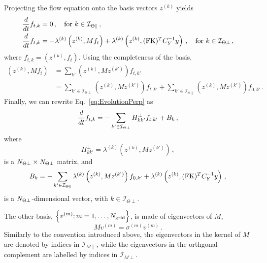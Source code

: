 \documentclass[11pt]{article}
\begin{document}
Projecting the flow equation onto the basis vectors $z^{(k)}$ yields
\begin{align}
  \label{eq:EvolutionPar}
  \frac{d}{dt} f_{t,k} &= 0\, , \quad \text{for}\ k \in \mathcal{I}_{\Theta\parallel}\, , \\
  \label{eq:EvolutionPerp}
  \frac{d}{dt} f_{t,k} &= - \lambda^{(k)} \left(z^{(k)}, M f_t\right) 
    + \lambda^{(k)} \left(z^{(k)}, (\mathrm{FK})^T C_Y^{-1} y\right)\, , \quad \text{for}\ k \in \mathcal{I}_{\Theta\perp}\, ,
\end{align}
where $f_{t,k} = \left(z^{(k)}, f_t\right)$. Using the completeness of the basis, 
\begin{align}
  \left(z^{(k)}, M f_t\right) 
    &= \sum_{k'} \left(z^{(k)}, M z^{(k')}\right) f_{t,k'} \\
    &= \sum_{k'\in \mathcal{I}_{\Theta\perp}} \left(z^{(k)}, M z^{(k')}\right) f_{t,k'} 
      + \sum_{k'\in \mathcal{I}_{\Theta\parallel}} \left(z^{(k)}, M z^{(k')}\right) f_{0,k'}\, .
\end{align}
Finally, we can rewrite Eq.~\eqref{eq:EvolutionPerp} as
\begin{equation}
  \label{eq:EvolutionPerpTwo}
  \frac{d}{dt} f_{t,k} = - \sum_{k'\in \mathcal{I}_{\Theta\perp}} 
     H^{\perp}_{kk'} f_{t,k'} + B_{k}\,  ,
\end{equation}
where
\begin{equation}
  \label{eq:HmatDef}
  H^{\perp}_{kk'} = \lambda^{(k)} \left(z^{(k)}, M z^{(k')}\right)\,, 
\end{equation}
is a $N_{\Theta\perp} \times N_{\Theta\perp}$ matrix, and 
\begin{equation}
  \label{eq:BkDef}
  B_{k} = -\sum_{k'\in \mathcal{I}_{\Theta\parallel}} \lambda^{(k)} \left(z^{(k)}, M z^{(k')}\right) f_{0,k'} + 
  \lambda^{(k)} \left(z^{(k)}, (\mathrm{FK})^T C_Y^{-1} y\right)\, ,
\end{equation}
is a $N_{\Theta\perp}$-dimensional vector, with $k \in \mathcal{I}_{\Theta\perp}$.


The other basis, $\displaystyle \left\{v^{(m)}; m = 1, \ldots, N_{\mathrm{grid}}\right\}$, is made of eigenvectors of $M$, 
\begin{equation}
  \label{eq:MmatEigenVect}
  M v^{(m)} = \sigma^{(m)} v^{(m)}\, .
\end{equation}
Similarly to the convention introduced above, the eigenvectors in the kernel of $M$ are denoted by indices in 
$\mathcal{I}_{M\parallel}$, while the eigenvectors in the orthgonal complement are labelled by indices in 
$\mathcal{I}_{M\perp}$. 
\end{document}
